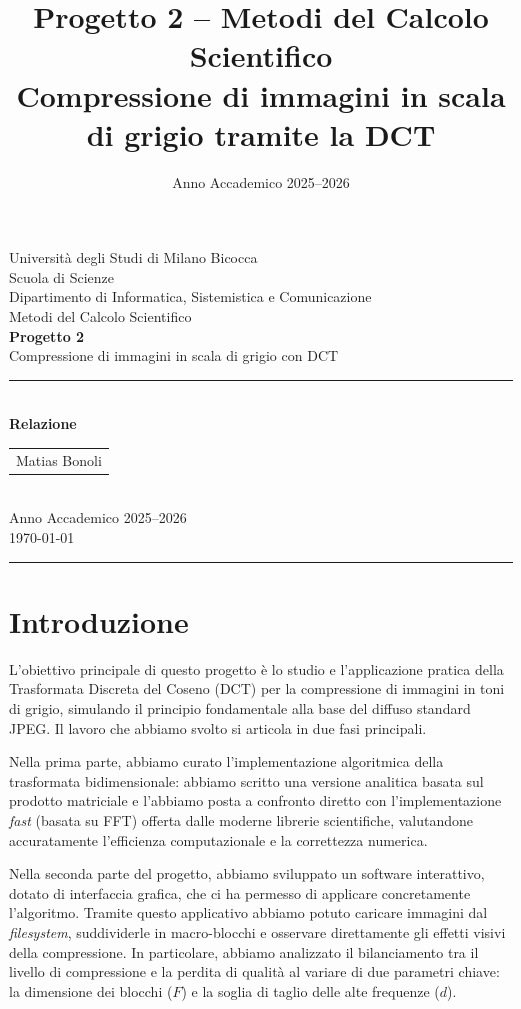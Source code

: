 \documentclass[11pt,a4paper]{article}
\title{\Large \textbf{Progetto 2 -- Metodi del Calcolo Scientifico}\\[2pt]
\large Compressione di immagini in scala di grigio tramite la DCT}
\author{}
\date{Anno Accademico 2025--2026}
\begin{document}
\begin{titlepage}
\centering
\vspace*{2.5cm}
{\large Università degli Studi di Milano Bicocca\\
Scuola di Scienze\\
Dipartimento di Informatica, Sistemistica e Comunicazione}\\[0.4cm]
{\large Metodi del Calcolo Scientifico}\\[1.6cm]
{\huge\bfseries Progetto 2}\\[0.5cm]
{\Large Compressione di immagini in scala di grigio con DCT}\\[2.5cm]
\rule{10cm}{0.4pt}\\[0.6cm]
{\large\bfseries Relazione}\\[2.2cm]
\begin{tabular}{c}
Matias Bonoli\\[0.2cm]
\end{tabular}\\[2.8cm]
{\large Anno Accademico 2025--2026}\\[0.3cm]
{\large \today}
\vfill
\end{titlepage}

\tableofcontents
\vspace{1cm}
\hrule
\vspace{0.4cm}

\newpage
\section{Introduzione}

L'obiettivo principale di questo progetto è lo studio e l'applicazione pratica della Trasformata Discreta del Coseno 
(DCT) per la compressione di immagini in toni di grigio, simulando il principio fondamentale alla base del diffuso 
standard JPEG. Il lavoro che abbiamo svolto si articola in due fasi principali. 

Nella prima parte, abbiamo curato l'implementazione algoritmica della trasformata bidimensionale: abbiamo scritto 
una versione analitica basata sul prodotto matriciale e l'abbiamo posta a confronto diretto con l'implementazione 
\textit{fast} (basata su FFT) offerta dalle moderne librerie scientifiche, valutandone accuratamente l'efficienza 
computazionale e la correttezza numerica. 

Nella seconda parte del progetto, abbiamo sviluppato un software interattivo, dotato di interfaccia 
grafica, che ci ha permesso di applicare concretamente l'algoritmo. Tramite questo applicativo abbiamo potuto caricare 
immagini dal \textit{filesystem}, suddividerle in macro-blocchi e osservare direttamente gli effetti visivi della 
compressione. In particolare, abbiamo analizzato il bilanciamento tra il livello di compressione e la perdita di qualità 
al variare di due parametri chiave: la dimensione dei blocchi ($F$) e la soglia di taglio delle alte frequenze ($d$). 
\end{document}
